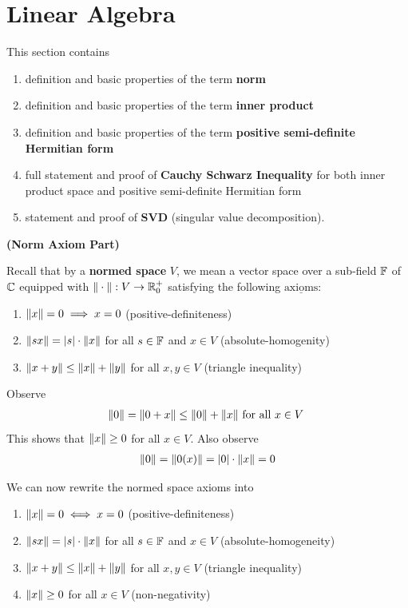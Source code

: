 \documentclass{report}
\begin{document}
\section{Linear Algebra}
\begin{mdframed}
This section contains
\begin{enumerate}[label=(\alph*)]
  \item definition and basic properties of the term \textbf{norm}
  \item definition and basic properties of the term \textbf{inner product}
  \item definition and basic properties of the term \textbf{positive semi-definite Hermitian form}
  \item full statement and proof of \textbf{Cauchy Schwarz Inequality} for both inner product space and positive semi-definite Hermitian form  
  \item statement and proof of \textbf{SVD} (singular value decomposition). 
\end{enumerate}
\end{mdframed}
\textbf{(Norm Axiom Part)}
\begin{mdframed}
Recall that by a \textbf{normed space} $V$, we mean a vector space over a sub-field $\mathbb{F}$ of $\mathbb{C}$ equipped with  $\| \cdot \|:V\to \mathbb{R}_0^+$ satisfying the following $\underline{\text{axioms}}$: 
\begin{enumerate}[label=(\alph*)]
  \item $\| x \|=0 \implies x=0$ (positive-definiteness)
  \item $\| sx \|=\left|s\right|\cdot \| x \|$ for all $s \in \mathbb{F}$ and $x\in V$ (absolute-homogenity)
  \item $\| x+y \|\leq \| x \|+\| y \|$ for all $x,y \in V$ (triangle inequality)
\end{enumerate}
Observe
\begin{align*}
\| 0 \|=\| 0+x \|\leq \| 0 \|+\| x \|\text{ for all $x\in V$ }
\end{align*}
This shows that $\| x \|\geq 0$ for all $x\in V$. Also observe 
\begin{align*}
\| 0 \|=\| 0(x) \|=\left|0\right|\cdot \| x \|=0
\end{align*}

We can now rewrite the normed space axioms into
\begin{enumerate}[label=(\alph*)]
  \item $\| x \|=0\iff x=0$ (positive-definiteness)
  \item $\| sx \|=\left|s\right|\cdot \| x \|$ for all $s \in \mathbb{F}$ and $x\in V$ (absolute-homogeneity)
  \item $\| x+y \|\leq \| x \|+\| y \|$ for all $x,y \in V$ (triangle inequality)
  \item $\| x \|\geq 0$ for all $x \in V$ (non-negativity)
\end{enumerate}
\end{mdframed}
\end{document}

